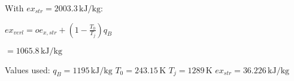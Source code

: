 With \( ex_{str} = 2003.3 \, \text{kJ}/\text{kg} \):  

\( ex_{verl} = oe_{x,str} + (1 - \frac{T_{0}}{T_{j}})q_{B} \)  

\( = 1065.8 \, \text{kJ}/\text{kg} \)  

Values used:  
\( q_{B} = 1195 \, \text{kJ}/\text{kg} \)  
\( T_{0} = 243.15 \, \text{K} \)  
\( T_{j} = 1289 \, \text{K} \)  
\( ex_{str} = 36.226 \, \text{kJ}/\text{kg} \)